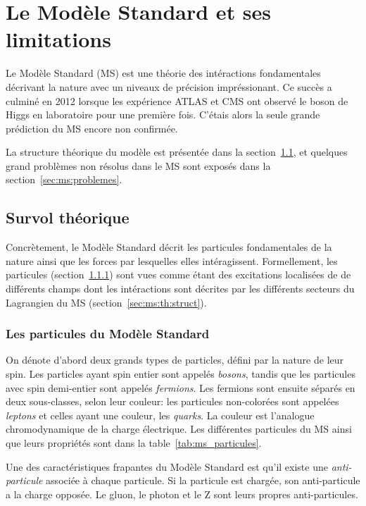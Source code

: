 \section{Le Modèle Standard et ses limitations}
\label{sec:ms}

Le Modèle Standard (MS) est une théorie des intéractions fondamentales
décrivant la nature avec un niveaux de précision impréssionant. Ce
succès a culminé en 2012 lorsque les expérience ATLAS et CMS ont
observé le boson de Higgs en laboratoire pour une première
fois. C'étais alors la seule grande prédiction du MS encore non
confirmée. 

La structure théorique du modèle est présentée dans la
section~\ref{sec:ms:th}, et quelques grand problèmes non résolus dans
le MS sont exposés dans la section~\ref{sec:ms:problemes}.

\subsection{Survol théorique}
\label{sec:ms:th}

Concrètement, le Modèle Standard décrit les particules fondamentales
de la nature ainsi que les forces par lesquelles elles
intéragissent. Formellement, les particules
(section~\ref{sec:ms:th:particules}) sont vues comme étant des
excitations localisées de de différents champs dont les intéractions
sont décrites par les différents secteurs du Lagrangien du MS
(section~\ref{sec:ms:th:struct}).

\subsubsection{Les particules du Modèle Standard}
\label{sec:ms:th:particules}

On dénote d'abord deux grands types de particles, défini par la nature
de leur spin. Les particles ayant spin entier sont appelés
\emph{bosons}, tandis que les particules avec spin demi-entier sont
appelés \emph{fermions}. Les fermions sont ensuite séparés en deux
sous-classes, selon leur couleur: les particules non-colorées sont
appelées \emph{leptons} et celles ayant une couleur, les
\emph{quarks}. La couleur est l'analogue chromodynamique de la charge
électrique.  Les différentes particules du MS ainsi que leurs
propriétés sont dans la table~\ref{tab:ms_particules}.

Une des caractéristiques frapantes du Modèle Standard est qu'il existe
une \emph{anti-particule} associée à chaque particule. Si la particule
est chargée, son anti-particule a la charge opposée. Le gluon, le
photon et le Z sont leurs propres anti-particules.

